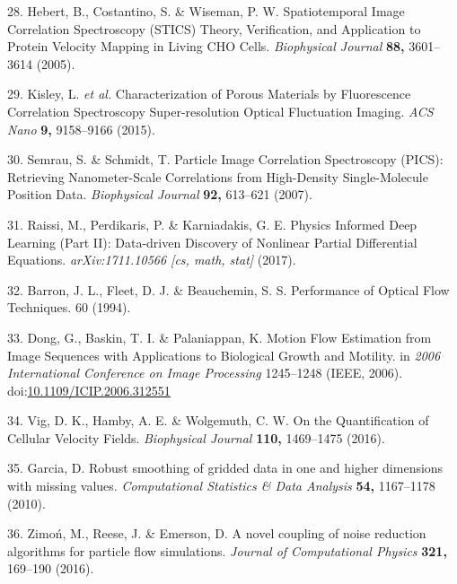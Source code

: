 \documentclass{Dissertate}
\begin{document}
\leavevmode\hypertarget{ref-hebert_spatiotemporal_2005}{}%
28. Hebert, B., Costantino, S. \& Wiseman, P. W. Spatiotemporal Image
Correlation Spectroscopy (STICS) Theory, Verification, and Application
to Protein Velocity Mapping in Living CHO Cells. \emph{Biophysical
Journal} \textbf{88,} 3601--3614 (2005).

\leavevmode\hypertarget{ref-kisley_characterization_2015}{}%
29. Kisley, L. \emph{et al.} Characterization of Porous Materials by
Fluorescence Correlation Spectroscopy Super-resolution Optical
Fluctuation Imaging. \emph{ACS Nano} \textbf{9,} 9158--9166 (2015).

\leavevmode\hypertarget{ref-semrau_particle_2007}{}%
30. Semrau, S. \& Schmidt, T. Particle Image Correlation Spectroscopy
(PICS): Retrieving Nanometer-Scale Correlations from High-Density
Single-Molecule Position Data. \emph{Biophysical Journal} \textbf{92,}
613--621 (2007).

\leavevmode\hypertarget{ref-raissi_physics_2017}{}%
31. Raissi, M., Perdikaris, P. \& Karniadakis, G. E. Physics Informed
Deep Learning (Part II): Data-driven Discovery of Nonlinear Partial
Differential Equations. \emph{arXiv:1711.10566 {[}cs, math, stat{]}}
(2017).

\leavevmode\hypertarget{ref-barron_performance_1994}{}%
32. Barron, J. L., Fleet, D. J. \& Beauchemin, S. S. Performance of
Optical Flow Techniques. 60 (1994).

\leavevmode\hypertarget{ref-dong_motion_2006}{}%
33. Dong, G., Baskin, T. I. \& Palaniappan, K. Motion Flow Estimation
from Image Sequences with Applications to Biological Growth and
Motility. in \emph{2006 International Conference on Image Processing}
1245--1248 (IEEE, 2006).
doi:\href{https://doi.org/10.1109/ICIP.2006.312551}{10.1109/ICIP.2006.312551}

\leavevmode\hypertarget{ref-vig_quantification_2016}{}%
34. Vig, D. K., Hamby, A. E. \& Wolgemuth, C. W. On the Quantification
of Cellular Velocity Fields. \emph{Biophysical Journal} \textbf{110,}
1469--1475 (2016).

\leavevmode\hypertarget{ref-garcia_robust_2010}{}%
35. Garcia, D. Robust smoothing of gridded data in one and higher
dimensions with missing values. \emph{Computational Statistics \& Data
Analysis} \textbf{54,} 1167--1178 (2010).

\leavevmode\hypertarget{ref-zimon_novel_2016}{}%
36. Zimoń, M., Reese, J. \& Emerson, D. A novel coupling of noise
reduction algorithms for particle flow simulations. \emph{Journal of
Computational Physics} \textbf{321,} 169--190 (2016).
\end{document}

